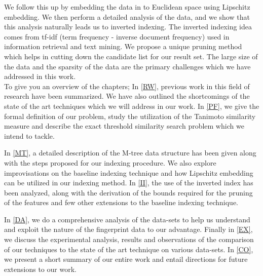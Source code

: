 We follow this up by embedding the data in to Euclidean space using Lipschitz embedding. We then perform a detailed analysis of the data, and we show that this analysis naturally leads us to inverted indexing. The inverted indexing idea comes from tf-idf (term frequency - inverse document frequency) used in information retrieval and text mining. We propose a unique pruning method which helps in cutting down the candidate list for our result set.  The large size of the data and the sparsity of the data are the primary challenges which we have addressed in this work.\\

To give you an overview of the chapters; In \autoref{RW}, previous work in this field of research have been summarized. We have also outlined the shortcomings of the state of the art techniques which we will address in our work. In \autoref{PF}, we give the formal definition of our problem, study the utilization of the Tanimoto similarity measure and describe the exact threshold similarity search problem which we intend to tackle.

In \autoref{MT}, a detailed description of the M-tree data structure has been given along with the steps proposed for our indexing procedure. We also explore improvisations on the baseline indexing technique and how Lipschitz embedding can be utilized in our indexing method. In \autoref{II}, the use of the inverted index has been analyzed, along with the derivation of the bounds required for the pruning of the features and few other extensions to the baseline indexing technique.

	In \autoref{DA}, we do a comprehensive analysis of the data-sets to help us understand and exploit the nature of the fingerprint data to our advantage. Finally in \autoref{EX}, we discuss the experimental analysis, results and observations of the comparison of our techniques to the state of the art technique on various data-sets. In \autoref{CO}, we present a short summary of our entire work and entail directions for future extensions to our work.



	